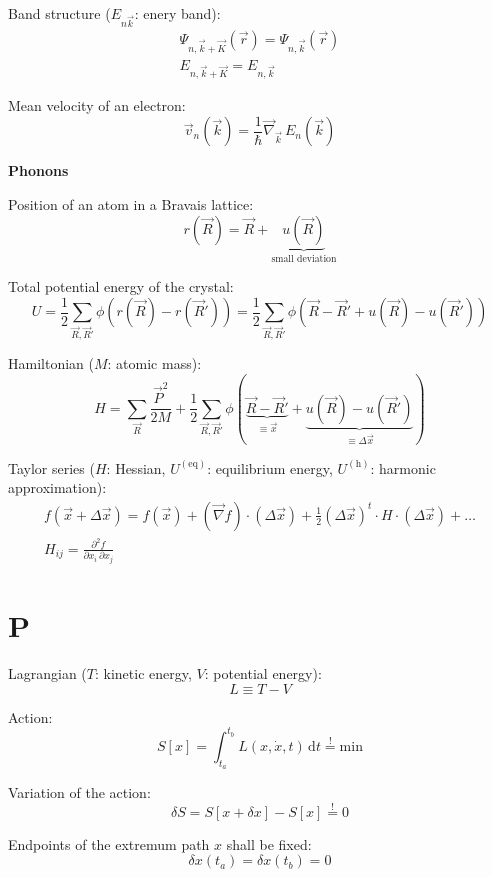 \documentclass[fontsize=11pt,a4paper]{scrartcl}
\begin{document}
Band structure ($E_{n\vec k}$: enery band):
\begin{gather*}
	\Psi_{n,\vec k+\vec K}(\vec r)=\Psi_{n,\vec k}(\vec r)\\
	E_{n,\vec k+\vec K}=E_{n,\vec k}
\end{gather*}

Mean velocity of an electron:
\[
	\vec v_n(\vec k)=\frac{1}{\hbar}\vec\nabla_{\vec k}\,E_n(\vec k)
\]

\textbf{\Large{Phonons}}

Position of an atom in a Bravais lattice:
\[
	r(\vec R)=\vec R+\underbrace{u(\vec R)}_\text{small deviation}
\]

Total potential energy of the crystal:
\[
	U=\frac{1}{2}\sum_{\vec R,\vec R'} \phi\left(r(\vec R)-r(\vec R')\right)=\frac{1}{2}\sum_{\vec R,\vec R'} \phi\left(\vec R-\vec R'+u(\vec R)-u(\vec R')\right)
\]

Hamiltonian ($M$: atomic mass):
\[
	H=\sum_{\vec R} \frac{\vec P^2}{2M}+\frac{1}{2}\sum_{\vec R,\vec R'} \phi(\underbrace{\vec R-\vec R'}_{\equiv\vec x}+\underbrace{u(\vec R)-u(\vec R')}_{\equiv\Delta\vec x})
\]

Taylor series ($H$: Hessian, $U^{(\mathrm{eq})}$: equilibrium energy, $U^{(\mathrm{h})}$: harmonic approximation):
\begin{gather*}
	f(\vec x+\Delta\vec x)=f(\vec x)+\left(\vec\nabla f\right)\cdot\left(\Delta\vec x\right)+\frac{1}{2}\left(\Delta\vec x\right)^t\cdot H\cdot\left(\Delta\vec x\right)+\dots\\
	H_{ij}=\frac{\partial^2 f}{\partial x_i\,\partial x_j}
\end{gather*}
%
%
%
%
%
\section{P}

Lagrangian ($T$: kinetic energy, $V$: potential energy):
\[
	L\equiv T-V
\]

Action:
\[
	S[x]=\int_{t_a}^{t_b} L(x,\dot x,t)\,\mathrm{d}t\stackrel{!}{=}\text{min}
\]

Variation of the action:
\[
	\delta S=S[x+\delta x]-S[x]\stackrel{!}{=}0
\]

Endpoints of the extremum path $x$ shall be fixed:
\[
	\delta x(t_a)=\delta x(t_b)=0
\]
\end{document}
